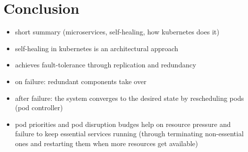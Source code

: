
\section{Conclusion}
  \begin{itemize}
    \item short summary (microservices, self-healing, how \gls{kubernetes} does it)
    \item self-healing in \gls{kubernetes} is an architectural approach
    \item achieves fault-tolerance through replication and redundancy
    \item on failure: redundant components take over
    \item after failure: the system converges to the desired state by rescheduling pods (pod controller)
    \item pod priorities and pod disruption budges help on resource pressure and failure to keep essential services running (through terminating non-essential ones and restarting them when more resources get available)
  \end{itemize}